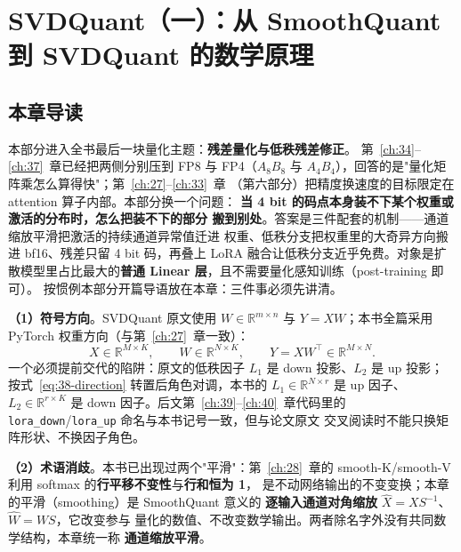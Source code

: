 \chapter{SVDQuant（一）：从 SmoothQuant 到 SVDQuant 的数学原理}\label{ch:38}

\section{本章导读}

本部分进入全书最后一块量化主题：\textbf{残差量化与低秩残差修正}。
第~\ref{ch:34}--\ref{ch:37}~章已经把两侧分别压到 FP8 与 FP4（$A_8B_8$ 与
$A_4B_4$），回答的是"量化矩阵乘怎么算得快"；第~\ref{ch:27}--\ref{ch:33}~章
（第六部分）把精度换速度的目标限定在 attention 算子内部。本部分换一个问题：
\textbf{当 4 bit 的码点本身装不下某个权重或激活的分布时，怎么把装不下的部分
搬到别处}。答案是三件配套的机制——通道缩放平滑把激活的持续通道异常值迁进
权重、低秩分支把权重里的大奇异方向搬进 bf16、残差只留 4 bit 码，再叠上
LoRA 融合让低秩分支近乎免费。对象是扩散模型里占比最大的\textbf{普通 Linear
层}，且不需要量化感知训练（post-training 即可）。
按惯例本部分开篇导语放在本章：三件事必须先讲清。

\textbf{（1）符号方向}。SVDQuant 原文使用 $W\in\mathbb{R}^{m\times n}$ 与
$Y=XW$；本书全篇采用 PyTorch 权重方向（与第~\ref{ch:27}~章一致）：
\begin{equation}
  X\in\mathbb{R}^{M\times K},\qquad
  W\in\mathbb{R}^{N\times K},\qquad
  Y=XW^{\top}\in\mathbb{R}^{M\times N}.
  \label{eq:38-direction}
\end{equation}
一个必须提前交代的陷阱：原文的低秩因子 $L_1$ 是 down 投影、$L_2$ 是 up 投影；
按式~\ref{eq:38-direction} 转置后角色对调，本书的 $L_1\in\mathbb{R}^{N\times r}$
是 up 因子、$L_2\in\mathbb{R}^{r\times K}$ 是 down 因子。后文第~\ref{ch:39}--\ref{ch:40}~章代码里的
\texttt{lora\_down}/\texttt{lora\_up} 命名与本书记号一致，但与论文原文
交叉阅读时不能只换矩阵形状、不换因子角色。

\textbf{（2）术语消歧}。本书已出现过两个"平滑"：第~\ref{ch:28}~章的
smooth-K/smooth-V 利用 softmax 的\textbf{行平移不变性}与\textbf{行和恒为 1}，
是不动网络输出的不变变换；本章的平滑（smoothing）是 SmoothQuant 意义的
\textbf{逐输入通道对角缩放} $\widehat X=XS^{-1}$、$\widehat W=WS$，它改变参与
量化的数值、不改变数学输出。两者除名字外没有共同数学结构，本章统一称
\textbf{通道缩放平滑}。

